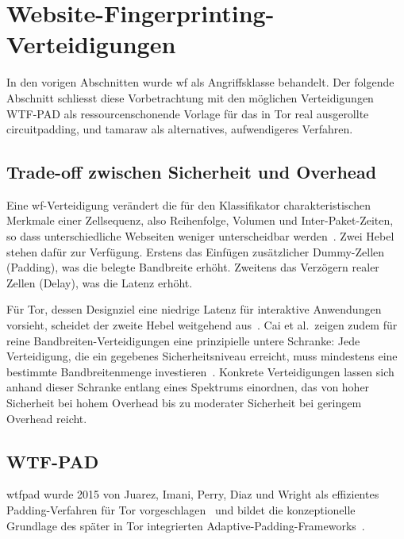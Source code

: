 \section{Website-Fingerprinting-Verteidigungen}
\label{sec:wf_defenses}

In den vorigen Abschnitten wurde \gls{wf} als Angriffsklasse behandelt.
Der folgende Abschnitt schliesst diese Vorbetrachtung mit den möglichen Verteidigungen WTF-PAD als ressourcenschonende Vorlage für das in Tor real ausgerollte \gls{circuitpadding}, und \gls{tamaraw} als alternatives, aufwendigeres Verfahren.

\subsection{Trade-off zwischen Sicherheit und Overhead}
\label{sec:wf_defenses_tradeoff}

Eine \gls{wf}-Verteidigung verändert die für den Klassifikator charakteristischen Merkmale einer Zellsequenz, also Reihenfolge, Volumen und Inter-Paket-Zeiten, so dass unterschiedliche Webseiten weniger unterscheidbar werden~\cite{cai2014systematic}.
Zwei Hebel stehen dafür zur Verfügung.
Erstens das Einfügen zusätzlicher Dummy-Zellen (Padding), was die belegte Bandbreite erhöht.
Zweitens das Verzögern realer Zellen (Delay), was die Latenz erhöht.

Für Tor, dessen Designziel eine niedrige Latenz für interaktive Anwendungen vorsieht, scheidet der zweite Hebel weitgehend aus~\cite{kadianakis2021tor}.
Cai et al.\ zeigen zudem für reine Bandbreiten-Verteidigungen eine prinzipielle untere Schranke: Jede Verteidigung, die ein gegebenes Sicherheitsniveau erreicht, muss mindestens eine bestimmte Bandbreitenmenge investieren~\cite{cai2014systematic}.
Konkrete Verteidigungen lassen sich anhand dieser Schranke entlang eines Spektrums einordnen, das von hoher Sicherheit bei hohem Overhead bis zu moderater Sicherheit bei geringem Overhead reicht.

\subsection{WTF-PAD}
\label{sec:wf_defenses_wtfpad}

\gls{wtfpad} wurde 2015 von Juarez, Imani, Perry, Diaz und Wright als effizientes Padding-Verfahren für Tor vorgeschlagen~\cite{juarez2015wtf} und bildet die konzeptionelle Grundlage des später in Tor integrierten Adaptive-Padding-Frameworks~\cite{kadianakis2021tor}.

